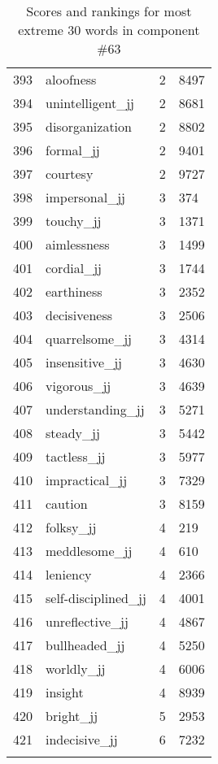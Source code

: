 \begin{longtable}[!htbp]{| rlr@{.}l |}
    393 & aloofness & 2 & 8497 \\
    394 & unintelligent\_jj & 2 & 8681 \\
    395 & disorganization & 2 & 8802 \\
    396 & formal\_jj & 2 & 9401 \\
    397 & courtesy & 2 & 9727 \\
    398 & impersonal\_jj & 3 & 374 \\
    399 & touchy\_jj & 3 & 1371 \\
    400 & aimlessness & 3 & 1499 \\
    401 & cordial\_jj & 3 & 1744 \\
    402 & earthiness & 3 & 2352 \\
    403 & decisiveness & 3 & 2506 \\
    404 & quarrelsome\_jj & 3 & 4314 \\
    405 & insensitive\_jj & 3 & 4630 \\
    406 & vigorous\_jj & 3 & 4639 \\
    407 & understanding\_jj & 3 & 5271 \\
    408 & steady\_jj & 3 & 5442 \\
    409 & tactless\_jj & 3 & 5977 \\
    410 & impractical\_jj & 3 & 7329 \\
    411 & caution & 3 & 8159 \\
    412 & folksy\_jj & 4 & 219 \\
    413 & meddlesome\_jj & 4 & 610 \\
    414 & leniency & 4 & 2366 \\
    415 & self-disciplined\_jj & 4 & 4001 \\
    416 & unreflective\_jj & 4 & 4867 \\
    417 & bullheaded\_jj & 4 & 5250 \\
    418 & worldly\_jj & 4 & 6006 \\
    419 & insight & 4 & 8939 \\
    420 & bright\_jj & 5 & 2953 \\
    421 & indecisive\_jj & 6 & 7232 \\
    \hline
    \caption{Scores and rankings for most extreme 30 words in component \#63} \\
\end{longtable}
